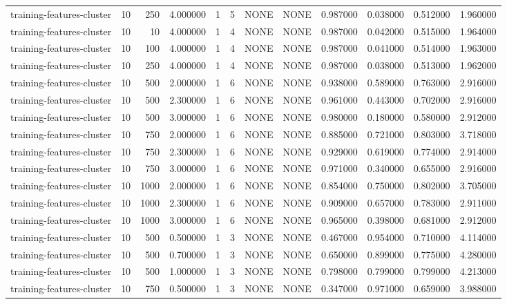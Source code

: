 \begin{tabular}{lrrrllllrrrr}
training-features-cluster & 10 & 250 & 4.000000 & 1 & 5 & NONE & NONE & 0.987000 & 0.038000 & 0.512000 & 1.960000 \\
training-features-cluster & 10 & 10 & 4.000000 & 1 & 4 & NONE & NONE & 0.987000 & 0.042000 & 0.515000 & 1.964000 \\
training-features-cluster & 10 & 100 & 4.000000 & 1 & 4 & NONE & NONE & 0.987000 & 0.041000 & 0.514000 & 1.963000 \\
training-features-cluster & 10 & 250 & 4.000000 & 1 & 4 & NONE & NONE & 0.987000 & 0.038000 & 0.513000 & 1.962000 \\
training-features-cluster & 10 & 500 & 2.000000 & 1 & 6 & NONE & NONE & 0.938000 & 0.589000 & 0.763000 & 2.916000 \\
training-features-cluster & 10 & 500 & 2.300000 & 1 & 6 & NONE & NONE & 0.961000 & 0.443000 & 0.702000 & 2.916000 \\
training-features-cluster & 10 & 500 & 3.000000 & 1 & 6 & NONE & NONE & 0.980000 & 0.180000 & 0.580000 & 2.912000 \\
training-features-cluster & 10 & 750 & 2.000000 & 1 & 6 & NONE & NONE & 0.885000 & 0.721000 & 0.803000 & 3.718000 \\
training-features-cluster & 10 & 750 & 2.300000 & 1 & 6 & NONE & NONE & 0.929000 & 0.619000 & 0.774000 & 2.914000 \\
training-features-cluster & 10 & 750 & 3.000000 & 1 & 6 & NONE & NONE & 0.971000 & 0.340000 & 0.655000 & 2.916000 \\
training-features-cluster & 10 & 1000 & 2.000000 & 1 & 6 & NONE & NONE & 0.854000 & 0.750000 & 0.802000 & 3.705000 \\
training-features-cluster & 10 & 1000 & 2.300000 & 1 & 6 & NONE & NONE & 0.909000 & 0.657000 & 0.783000 & 2.911000 \\
training-features-cluster & 10 & 1000 & 3.000000 & 1 & 6 & NONE & NONE & 0.965000 & 0.398000 & 0.681000 & 2.912000 \\
training-features-cluster & 10 & 500 & 0.500000 & 1 & 3 & NONE & NONE & 0.467000 & 0.954000 & 0.710000 & 4.114000 \\
training-features-cluster & 10 & 500 & 0.700000 & 1 & 3 & NONE & NONE & 0.650000 & 0.899000 & 0.775000 & 4.280000 \\
training-features-cluster & 10 & 500 & 1.000000 & 1 & 3 & NONE & NONE & 0.798000 & 0.799000 & 0.799000 & 4.213000 \\
training-features-cluster & 10 & 750 & 0.500000 & 1 & 3 & NONE & NONE & 0.347000 & 0.971000 & 0.659000 & 3.988000 \\

\end{tabular}
